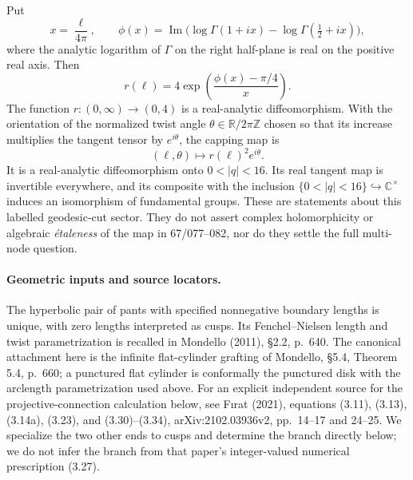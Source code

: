 Put
\[
 x=\frac{\ell}{4\pi},\qquad
 \phi(x)=\operatorname{Im}\bigl(\log\Gamma(1+ix)
                       -\log\Gamma(\tfrac12+ix)\bigr),
\]
where the analytic logarithm of $\Gamma$ on the right half-plane is
real on the positive real axis. Then
\[
 \boxed{\quad r(\ell)=4\exp\!\left(\frac{\phi(x)-\pi/4}{x}\right).\quad}
                                                               \tag{AQ.67.1}
\]
The function $r:(0,\infty)\longrightarrow(0,4)$ is a real-analytic
diffeomorphism. With the orientation of the normalized twist angle
$\theta\in\mathbb R/2\pi\mathbb Z$ chosen so that its increase multiplies
the tangent tensor by $e^{i\theta}$, the capping map is
\[
 (\ell,\theta)\longmapsto r(\ell)^2e^{i\theta}.
                                                               \tag{AQ.67.2}
\]
It is a real-analytic diffeomorphism onto $0<|q|<16$.
Its real tangent map is invertible everywhere, and its composite with
the inclusion $\{0<|q|<16\}\hookrightarrow\mathbb C^\times$ induces an
isomorphism of fundamental groups. These are statements about this
labelled geodesic-cut sector. They do not assert complex holomorphicity
or algebraic \emph{\'etaleness} of the map in 67/077--082, nor do they
settle the full multi-node question.

\paragraph{Geometric inputs and source locators.}
The hyperbolic pair of pants with specified nonnegative boundary
lengths is unique, with zero lengths interpreted as cusps. Its
Fenchel--Nielsen length and twist parametrization is recalled in
Mondello (2011), \S2.2, p.~640. The canonical attachment here is the
infinite flat-cylinder grafting of Mondello, \S5.4,
Theorem 5.4, p.~660; a punctured flat cylinder is conformally the
punctured disk with the arclength parametrization used above.
For an explicit independent source for the projective-connection
calculation below, see F\i rat (2021), equations (3.11), (3.13),
(3.14a), (3.23), and (3.30)--(3.34), arXiv:2102.03936v2,
pp.~14--17 and 24--25. We specialize the two other ends to cusps
and determine the branch directly below; we do not infer the branch
from that paper's integer-valued numerical prescription (3.27).

